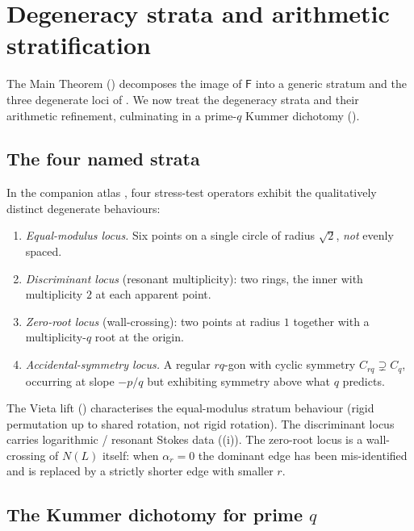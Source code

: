 \documentclass[aip,jmp,preprint,amsmath,amssymb,nofootinbib,floatfix]{revtex4-2}
\theoremstyle{plain}
\theoremstyle{definition}
\theoremstyle{remark}
\newcommand{\NL}{N(L)}
\newcommand{\Fclass}{\mathsf{F}}
\begin{document}
\section{Degeneracy strata and arithmetic stratification}\label{sec:degeneracy}

The Main Theorem () decomposes the image of $\Fclass$
into a generic stratum and the three degenerate loci of
. We now treat the degeneracy strata and their
arithmetic refinement, culminating in a prime-$q$ Kummer dichotomy
().

\subsection{The four named strata}\label{ssec:strata-named}

In the companion atlas \cite{wkb_dataset_v1}, four stress-test operators
exhibit the qualitatively distinct degenerate behaviours:
\begin{enumerate}[leftmargin=2em]
\item \emph{Equal-modulus locus.} Six points on a single circle of
      radius $\sqrt{2}$, \emph{not} evenly spaced.
\item \emph{Discriminant locus} (resonant multiplicity): two rings, the
      inner with multiplicity $2$ at each apparent point.
\item \emph{Zero-root locus} (wall-crossing): two points at radius $1$
      together with a multiplicity-$q$ root at the origin.
\item \emph{Accidental-symmetry locus.} A regular $rq$-gon with cyclic
      symmetry $C_{rq} \supsetneq C_q$, occurring at slope $-p/q$ but
      exhibiting symmetry above what $q$ predicts.
\end{enumerate}
The Vieta lift () characterises the equal-modulus stratum
behaviour (rigid permutation up to shared rotation, not rigid rotation).
The discriminant locus carries logarithmic / resonant Stokes data
((i)). The zero-root locus is a wall-crossing of
$\NL$ itself: when $\alpha_r = 0$ the dominant edge has been mis-identified
and is replaced by a strictly shorter edge with smaller $r$.

\subsection{\texorpdfstring{The Kummer dichotomy for prime $q$}{The Kummer dichotomy for prime q}}\label{ssec:D2}
\end{document}

